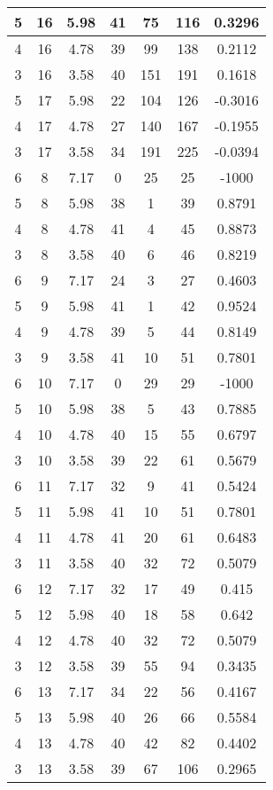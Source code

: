 \documentclass[letterpaper, 12pt]{article}
\begin{document}
\begin{longtable}{|c|c|c|c|c|c|c|}
\hline
5 & 16 & 5.98 & 41 & 75 & 116 & 0.3296 \\
\hline
4 & 16 & 4.78 & 39 & 99 & 138 & 0.2112 \\
\hline
3 & 16 & 3.58 & 40 & 151 & 191 & 0.1618 \\
\hline
5 & 17 & 5.98 & 22 & 104 & 126 & -0.3016 \\
\hline
4 & 17 & 4.78 & 27 & 140 & 167 & -0.1955 \\
\hline
3 & 17 & 3.58 & 34 & 191 & 225 & -0.0394 \\
\hline
6 & 8 & 7.17 & 0 & 25 & 25 & -1000 \\
\hline
5 & 8 & 5.98 & 38 & 1 & 39 & 0.8791 \\
\hline
4 & 8 & 4.78 & 41 & 4 & 45 & 0.8873 \\
\hline
3 & 8 & 3.58 & 40 & 6 & 46 & 0.8219 \\
\hline
6 & 9 & 7.17 & 24 & 3 & 27 & 0.4603 \\
\hline
5 & 9 & 5.98 & 41 & 1 & 42 & 0.9524 \\
\hline
4 & 9 & 4.78 & 39 & 5 & 44 & 0.8149 \\
\hline
3 & 9 & 3.58 & 41 & 10 & 51 & 0.7801 \\
\hline
6 & 10 & 7.17 & 0 & 29 & 29 & -1000 \\
\hline
5 & 10 & 5.98 & 38 & 5 & 43 & 0.7885 \\
\hline
4 & 10 & 4.78 & 40 & 15 & 55 & 0.6797 \\
\hline
3 & 10 & 3.58 & 39 & 22 & 61 & 0.5679 \\
\hline
6 & 11 & 7.17 & 32 & 9 & 41 & 0.5424 \\
\hline
5 & 11 & 5.98 & 41 & 10 & 51 & 0.7801 \\
\hline
4 & 11 & 4.78 & 41 & 20 & 61 & 0.6483 \\
\hline
3 & 11 & 3.58 & 40 & 32 & 72 & 0.5079 \\
\hline
6 & 12 & 7.17 & 32 & 17 & 49 & 0.415 \\
\hline
5 & 12 & 5.98 & 40 & 18 & 58 & 0.642 \\
\hline
4 & 12 & 4.78 & 40 & 32 & 72 & 0.5079 \\
\hline
3 & 12 & 3.58 & 39 & 55 & 94 & 0.3435 \\
\hline
6 & 13 & 7.17 & 34 & 22 & 56 & 0.4167 \\
\hline
5 & 13 & 5.98 & 40 & 26 & 66 & 0.5584 \\
\hline
4 & 13 & 4.78 & 40 & 42 & 82 & 0.4402 \\
\hline
3 & 13 & 3.58 & 39 & 67 & 106 & 0.2965 \\

\end{longtable}
\end{document}
